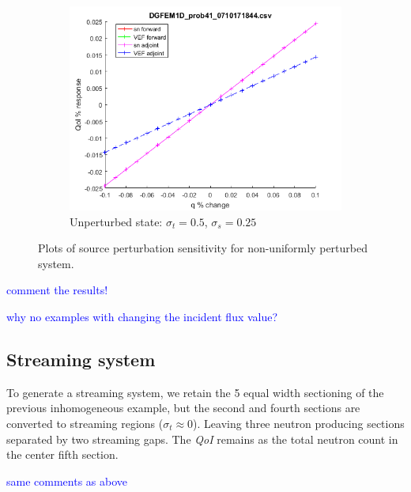 \documentclass{article}
\newcommand{\sigt}{\sigma_t}
\newcommand{\sigs}{\sigma_s}
\newcommand{\qoi}{{\it QoI}\xspace}
\newcommand{\comment}[2]{\marginpar{\textcolor{#2}{$\star$}}\textcolor{#2}{#1}\newline}
\newcommand{\jcr}[1]{\comment{#1}{blue}}
\newcommand{\jcr}[1]{\phantom{a}}
\begin{document}
\begin{figure}[H]
\begin{subfigure}{.65\textwidth}
  \centering
  \includegraphics[width=.98\linewidth]{figures/41qSens.png}
  \caption{Unperturbed state: $\sigt=0.5$, $\sigs=0.25$}
  \label{fig:sfig3}
\end{subfigure}
\caption{Plots of source perturbation sensitivity for non-uniformly perturbed system.}
\label{fig:fig}
\end{figure}


\jcr{comment the results!}

\jcr{why no examples with changing the incident flux value?}



\subsection{Streaming system}
To generate a streaming system, we retain the 5 equal width sectioning of the previous inhomogeneous example, but the second and fourth sections are converted to streaming regions ($\sigt \approx 0 $). Leaving three neutron producing sections separated by two streaming gaps. The \qoi remains as the total neutron count in the center fifth section.

\jcr{same comments as above}
\end{document}
